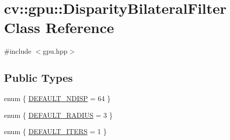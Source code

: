 \hypertarget{classcv_1_1gpu_1_1DisparityBilateralFilter}{\section{cv\-:\-:gpu\-:\-:Disparity\-Bilateral\-Filter Class Reference}
\label{classcv_1_1gpu_1_1DisparityBilateralFilter}
}


{\ttfamily \#include $<$gpu.\-hpp$>$}

\subsection*{Public Types}
\begin{DoxyCompactItemize}
\item 
enum \{ \hyperlink{classcv_1_1gpu_1_1DisparityBilateralFilter_a63ac0856feae5097af3ff4e36addebcdaf836d97561d11485f55798919244662d}{D\-E\-F\-A\-U\-L\-T\-\_\-\-N\-D\-I\-S\-P} = 64
 \}
\item 
enum \{ \hyperlink{classcv_1_1gpu_1_1DisparityBilateralFilter_a9425d7ecb0640b4155376a55f4be8fe2a4d67e68ea06c6e8c17538039d92371b2}{D\-E\-F\-A\-U\-L\-T\-\_\-\-R\-A\-D\-I\-U\-S} = 3
 \}
\item 
enum \{ \hyperlink{classcv_1_1gpu_1_1DisparityBilateralFilter_ac8df35acbf75dd8638f9dae2c1ab750da86aa9f9a5e2905c7adc57c6d479f91d9}{D\-E\-F\-A\-U\-L\-T\-\_\-\-I\-T\-E\-R\-S} = 1
 \}
\end{DoxyCompactItemize}
